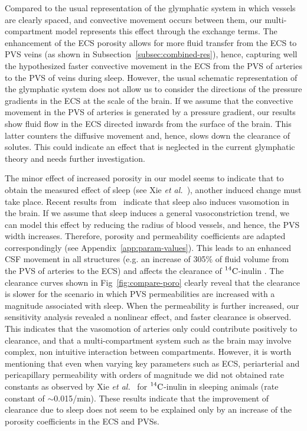 \documentclass[a4paper,11pt]{article}
\newcommand{\etal}{\emph{et al.}\;}
\newcommand{\1}{^{(1)}}
\newcommand{\2}{^{(2)}}
\newcommand{\Cinulin}{$\prescript{14}{}{\text{C}}$-inulin }
\begin{document}
Compared to the usual representation of the glymphatic system in which vessels are clearly spaced, and convective movement occurs between them, our multi-compartment model represents this effect through the exchange terms. 
The enhancement of the ECS porosity allows for more fluid transfer from the ECS to PVS veins (as shown in Subsection~\ref{subsec:combined-res}), hence, capturing well the hypothesized faster convective movement in the ECS from the PVS of arteries to the PVS of veins during sleep. However, the usual schematic representation of the glymphatic system does not allow us to consider the directions of the pressure gradients in the ECS at the scale of the brain. If we assume that the convective movement in the PVS of arteries is generated by a pressure gradient, our results show fluid flow in the ECS directed inwards from the surface of the brain. This latter counters the diffusive movement and, hence, slows down the clearance of solutes. This could indicate an effect that is neglected in the current glymphatic theory and needs further investigation. 


The minor effect of increased porosity in our model seems to indicate that to obtain the measured effect of sleep (see Xie \etal~\cite{Xie_2013_sleep}), another induced change must take place. Recent results from~\cite{Bojarskaite2022} indicate that sleep also induces vasomotion in the brain. If we assume that sleep induces a general vasoconstriction trend, we can model this effect by reducing the radius of blood vessels, and hence, the PVS width increases. Therefore, porosity and permeability coefficients are adapted correspondingly (see Appendix~\ref{app:param-values}). This leads to an enhanced CSF movement in all structures (e.g. an increase of 305\% of fluid volume from the PVS of arteries to the ECS) and affects the clearance of \Cinulin. The clearance curves shown in  Fig~\ref{fig:compare-poro} clearly reveal that the clearance is slower for the scenario in which PVS permeabilities are increased with a magnitude associated with sleep. When the permeability is further increased, our sensitivity analysis revealed a nonlinear effect, and faster clearance is observed. This indicates that the vasomotion of arteries only could contribute positively to clearance, and that a multi-compartment system such as the brain may involve complex, non intuitive interaction between compartments. 
However, it is worth mentioning that even when varying key parameters such as ECS, periarterial and pericapillary permeability with orders of magnitude we did not obtained rate constants as observed by Xie \etal~\cite{Xie_2013_sleep} for \Cinulin in sleeping animals (rate constant of $\sim$0.015/min). These results indicate that the improvement of clearance due to sleep does not seem to be explained only by an increase of the porosity coefficients in the ECS and PVSs. 
\end{document}
